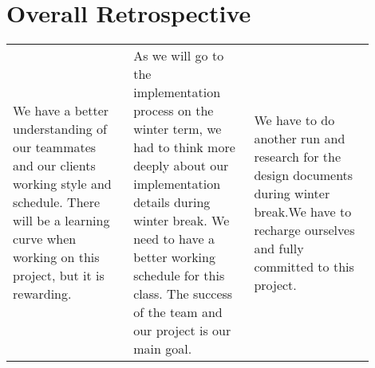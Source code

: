 \documentclass[letterpaper,10pt,onecolumn]{IEEEtran}
\begin{document}
\newpage
\section{Overall Retrospective}
\hfill
\begin{center}
\begin{tabular}{|p{0.3\linewidth}|p{0.3\linewidth}|p{0.3\linewidth}|} 
\hline
	\centering{\textbf{Postive}} & \centering{\textbf{Deltas}} & \centering{\textbf{Action}} \tabularnewline
	\hline
	We have a better understanding of our teammates and our clients working style and schedule. There will be a learning curve when working on this project, but it is rewarding. &
	As we will go to the implementation process on the winter term, we had to think more deeply about our implementation details during winter break. We need to have a better working schedule for this class. The success of the team and our project is our main goal. &
	We have to do another run and research for the design documents during winter break.We have to recharge ourselves and fully committed to this project. \\
\hline	
\end{tabular}
\end{center}

\newpage
\nocite{*}


\end{document}
